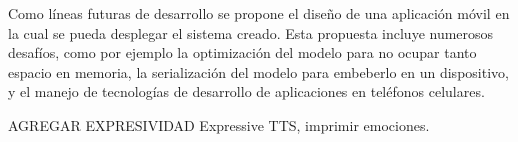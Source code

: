 Como líneas futuras de desarrollo se propone el diseño de una aplicación móvil en la cual se pueda desplegar el sistema creado. Esta propuesta incluye numerosos desafíos, como por ejemplo la optimización del modelo para no ocupar tanto espacio en memoria, la serialización del modelo para embeberlo en un dispositivo, y el manejo de tecnologías de desarrollo de aplicaciones en teléfonos celulares.

AGREGAR EXPRESIVIDAD Expressive TTS, imprimir emociones.

\textcolor{white}{
\parencite{Beranek2005ConcertHA} 
\parencite{busch2005noise}
\parencite{Call2007SoundP}
\parencite{Gardner2002}
\parencite{iso1996-2}
\parencite{kracht2007noise}
\parencite{Lawson2010SoundIntensity}
\parencite{MacLeod2007QuietingWeinberg}
\parencite{Mazer2012Creating}
\parencite{Orellana2006NoiseIT}
\parencite{richardson2009development}
\parencite{Ryherd2008CharacterizingNA}
\parencite{sanz2012tecnicas}
\parencite{Taylor1958NoiseCI}
\parencite{Tsiou2008Noise}
\parencite{text-to-speech-ibm}
\parencite{West2008NoiseIH}}